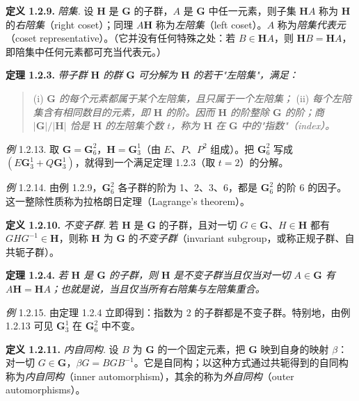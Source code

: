 \textbf{定义 1.2.9.} \textit{陪集.} 设 $\mathbf{H}$ 是 $\mathbf{G}$ 的子群，$A$ 是 $\mathbf{G}$ 中任一元素，则子集 $\mathbf{H}A$ 称为 $\mathbf{H}$ 的\textit{右陪集}（right coset）；同理 $A\mathbf{H}$ 称为\textit{左陪集}（left coset）。$A$ 称为\textit{陪集代表元}（coset representative）。（它并没有任何特殊之处：若 $B \in \mathbf{H}A$，则 $\mathbf{H}B = \mathbf{H}A$，即陪集中任何元素都可充当代表元。）

\textbf{定理 1.2.3.} \textit{带子群 $\mathbf{H}$ 的群 $\mathbf{G}$ 可分解为 $\mathbf{H}$ 的若干"左陪集"，满足：}

\begin{quote}
(i) \textit{$\mathbf{G}$ 的每个元素都属于某个左陪集，且只属于一个左陪集；}
(ii) \textit{每个左陪集含有相同数目的元素，即 $\mathbf{H}$ 的阶。因而 $\mathbf{H}$ 的阶整除 $\mathbf{G}$ 的阶；商 $|\mathbf{G}|/|\mathbf{H}|$ 恰是 $\mathbf{H}$ 的左陪集个数 $t$，称为 $\mathbf{H}$ 在 $\mathbf{G}$ 中的"指数"（index）。}
\end{quote}

\textit{例} 1.2.13. 取 $\mathbf{G} = \mathbf{G}_6^2$，$\mathbf{H} = \mathbf{G}_3^1$（由 $E$、$P$、$P^{2}$ 组成）。把 $\mathbf{G}_6^2$ 写成 $(E\mathbf{G}_3^1 + Q\mathbf{G}_3^1)$，就得到一个满足定理 1.2.3（取 $t = 2$）的分解。

\textit{例} 1.2.14. 由例 1.2.9，$\mathbf{G}_6^2$ 各子群的阶为 1、2、3、6，都是 $\mathbf{G}_6^2$ 的阶 6 的因子。这一整除性质称为拉格朗日定理（Lagrange's theorem）。

\textbf{定义 1.2.10.} \textit{不变子群.} 若 $\mathbf{H}$ 是 $\mathbf{G}$ 的子群，且对一切 $G \in \mathbf{G}$、$H \in \mathbf{H}$ 都有 $GHG^{-1} \in \mathbf{H}$，则称 $\mathbf{H}$ 为 $\mathbf{G}$ 的\textit{不变子群}（invariant subgroup，或称正规子群、自共轭子群）。

\textbf{定理 1.2.4.} \textit{若 $\mathbf{H}$ 是 $\mathbf{G}$ 的子群，则 $\mathbf{H}$ 是不变子群当且仅当对一切 $A \in \mathbf{G}$ 有 $A\mathbf{H} = \mathbf{H}A$；也就是说，当且仅当所有右陪集与左陪集重合。}

\textit{例} 1.2.15. 由定理 1.2.4 立即得到：指数为 2 的子群都是不变子群。特别地，由例 1.2.13 可见 $\mathbf{G}_3^1$ 在 $\mathbf{G}_6^2$ 中不变。

\textbf{定义 1.2.11.} \textit{内自同构.} 设 $B$ 为 $\mathbf{G}$ 的一个固定元素，把 $\mathbf{G}$ 映到自身的映射 $\beta$：对一切 $G \in \mathbf{G}$，$\beta G = BGB^{-1}$。它是自同构；以这种方式通过共轭得到的自同构称为\textit{内自同构}（inner automorphism），其余的称为\textit{外自同构}（outer automorphisms）。

